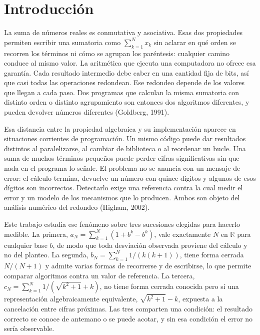 \section{Introducción}
\label{sec:introduccion}

La suma de números reales es conmutativa y asociativa. Esas dos propiedades permiten escribir una
sumatoria como $\sum_{k=1}^{N} x_k$ sin aclarar en qué orden se recorren los términos ni cómo se
agrupan los paréntesis: cualquier camino conduce al mismo valor. La aritmética que ejecuta una
computadora no ofrece esa garantía. Cada resultado intermedio debe caber en una cantidad fija de
bits, así que casi todas las operaciones redondean. Ese redondeo depende de los valores que llegan
a cada paso. Dos programas que calculan la misma sumatoria con distinto orden o distinto
agrupamiento son entonces dos algoritmos diferentes, y pueden devolver números diferentes
(Goldberg, 1991).

Esa distancia entre la propiedad algebraica y su implementación aparece en situaciones corrientes de
programación. Un mismo código puede dar resultados distintos al paralelizarse, al cambiar de
biblioteca o al reordenar un bucle. Una suma de muchos términos pequeños puede perder cifras
significativas sin que nada en el programa lo señale. El problema no se anuncia con un mensaje de
error: el cálculo termina, devuelve un número con quince dígitos y algunos de esos dígitos son
incorrectos. Detectarlo exige una referencia contra la cual medir el error y un modelo de los
mecanismos que lo producen. Ambos son objeto del análisis numérico del redondeo (Higham, 2002).

Este trabajo estudia ese fenómeno sobre tres sucesiones elegidas para hacerlo medible. La primera,
$a_N = \sum_{k=1}^{N} (1 + b^{k} - b^{k})$, vale exactamente $N$ en $\mathbb{R}$ para cualquier base
$b$, de modo que toda desviación observada proviene del cálculo y no del planteo. La segunda,
$b_N = \sum_{k=1}^{N} 1/(k(k+1))$, tiene forma cerrada $N/(N+1)$ y admite varias formas de
recorrerse y de escribirse, lo que permite comparar algoritmos contra un valor de referencia. La
tercera, $c_N = \sum_{k=1}^{N} 1/(\sqrt{k^{2}+1} + k)$, no tiene forma cerrada conocida pero sí una
representación algebraicamente equivalente, $\sqrt{k^{2}+1} - k$, expuesta a la cancelación entre
cifras próximas. Las tres comparten una condición: el resultado correcto se conoce de antemano o se
puede acotar, y sin esa condición el error no sería observable.

